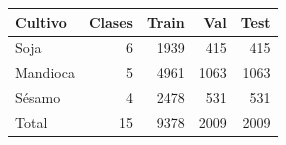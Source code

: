 \begin{tabular}{lrrrr}
\hline
Cultivo & Clases & Train & Val & Test \\
\hline
Soja & 6 & 1939 & 415 & 415 \\
Mandioca & 5 & 4961 & 1063 & 1063 \\
S\'esamo & 4 & 2478 & 531 & 531 \\
\hline
Total & 15 & 9378 & 2009 & 2009 \\
\hline
\end{tabular}
